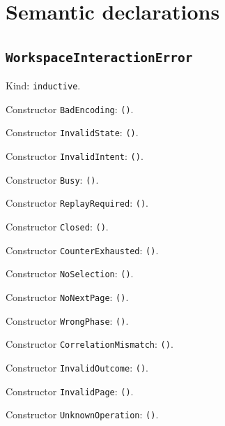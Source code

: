 \documentclass[11pt]{article}
\begin{document}
\section*{Semantic declarations}
\subsection*{\texttt{WorkspaceInteractionError}}
\noindent Kind: \texttt{inductive}.\par
\noindent Constructor \texttt{BadEncoding}: \texttt{()}.\par
\noindent Constructor \texttt{InvalidState}: \texttt{()}.\par
\noindent Constructor \texttt{InvalidIntent}: \texttt{()}.\par
\noindent Constructor \texttt{Busy}: \texttt{()}.\par
\noindent Constructor \texttt{ReplayRequired}: \texttt{()}.\par
\noindent Constructor \texttt{Closed}: \texttt{()}.\par
\noindent Constructor \texttt{CounterExhausted}: \texttt{()}.\par
\noindent Constructor \texttt{NoSelection}: \texttt{()}.\par
\noindent Constructor \texttt{NoNextPage}: \texttt{()}.\par
\noindent Constructor \texttt{WrongPhase}: \texttt{()}.\par
\noindent Constructor \texttt{CorrelationMismatch}: \texttt{()}.\par
\noindent Constructor \texttt{InvalidOutcome}: \texttt{()}.\par
\noindent Constructor \texttt{InvalidPage}: \texttt{()}.\par
\noindent Constructor \texttt{UnknownOperation}: \texttt{()}.\par
\end{document}
